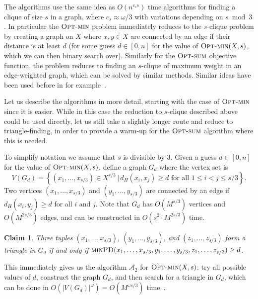 \documentclass[11pt, letterpaper]{article}
\newtheorem{claim}[theorem]{Claim}
\theoremstyle{definition}
\newcommand{\PD}{\textsc{minPD}}
\newcommand{\opts}{\textsc{Opt-sum}}
\newcommand{\optm}{\textsc{Opt-min}}
\begin{document}
The algorithms use the same idea as $O(n^{c_s s})$ time algorithms for finding a clique of size $s$ in a graph, where $c_s \approx \omega/3$ with variations depending on $s \bmod 3$ \cite{EisenbrandG2004Clique}. In particular the $\optm$ problem immediately reduces to the $s$-clique problem by creating a graph on $X$ where $x, y \in X$ are connected by an edge if their distance is at least $d$ (for some guess $d \in [0,n]$ for the value of $\optm(X, s)$, which we can then binary search over).  Similarly for the $\opts$ objective function, the problem reduces to finding an $s$-clique of maximum weight in an edge-weighted graph, which can be solved by similar methods. Similar ideas have been used before in for example~\cite{williams2005new}.

Let us describe the algorithms in more detail, starting with the case of $\optm$ since it is easier.  While in this case the reduction to $s$-clique described above could be used directly, let us still take a slightly longer route and reduce to triangle-finding, in order to provide a warm-up for the $\opts$ algorithm where this is needed.

To simplify notation we assume that $s$ is divisible by $3$.  Given a guess $d \in [0,n]$ for the value of $\optm(X, s)$, define a graph $G_d$ where the vertex set is
\[
V(G_d) = \left\{ (x_1, \ldots, x_{s/3}) \in X^{s/3} \,|\,d_H(x_i, x_j) \ge d \text{ for all } 1 \le i < j \le s/3 \right\}.
\]
Two vertices $(x_1, \ldots, x_{s/3})$ and $(y_1, \ldots, y_{s/3})$ are connected by an edge if $d_H(x_i, y_j) \ge d$ for all $i$ and $j$.  Note that $G_d$ has $O(M^{s/3})$ vertices and $O(M^{2s/3})$ edges, and can be constructed in $O(s^2 \cdot M^{2s/3})$ time.

\begin{claim}
    Three tuples $(x_1, \ldots, x_{s/3})$, $(y_1, \ldots, y_{s/3})$, and $(z_1, \ldots, z_{s/3})$ form a triangle in $G_d$ if and only if $\PD(x_1, \ldots, x_{s/3}, y_1, \ldots, y_{s/3}, z_1, \ldots, z_{s/3}) \ge d$.
\end{claim}

This immediately gives us the algorithm $\mathcal{A}_2$ for $\optm(X, s)$: try all possible values of $d$, construct the graph $G_d$, and then search for a triangle in $G_d$, which can be done in $O(|V(G_d)|^{\omega}) = O(M^{\omega s / 3})$ time~\cite{itai1977finding}.
\end{document}
